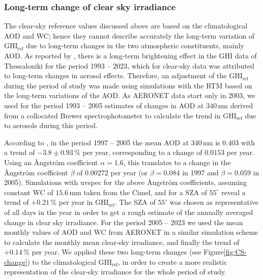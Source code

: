 \documentclass[preprint, 5p,
authoryear]{elsarticle} %
\begin{document}
\hypertarget{long-term-change-of-clear-sky-irradiance}{%
\subsubsection{Long-term change of clear sky
irradiance}\label{long-term-change-of-clear-sky-irradiance}}

The clear-sky reference values discussed above are based on the
climatological AOD and WC; hence they cannot describe accurately the
long-term variation of \(\text{GHI}_\text{ref}\) due to long-term
changes in the two atmospheric constituents, mainly AOD. As reported by
\citet{Natsis2023}, there is a long-term brightening effect in the GHI
data of Thessaloniki for the period 1993 -- 2023, which for clear-sky
data was attributed to long-term changes in aerosol effects. Therefore,
an adjustment of the \(\text{GHI}_\text{ref}\) during the period of
study was made using simulations with the RTM based on the long-term
variations of the AOD. As AERONET data start only in 2003, we used for
the period 1993 -- 2005 estimates of changes in AOD at
\(340\,\text{nm}\) derived from a collocated Brewer spectrophotometer
\citep{Kazadzis2007} to calculate the trend in \(\text{GHI}_\text{ref}\)
due to aerosols during this period.

According to \citet{Kazadzis2007}, in the period 1997 -- 2005 the mean
AOD at \(340\,\text{nm}\) is \(0.403\) with a trend of
\(-3.8\pm0.93\,\%\) per year, corresponding to a change of \(0.0153\)
per year. Using an Ångström coefficient \(\alpha = 1.6\), this
translates to a change in the Ångström coefficient \(\beta\) of
\(0.00272\) per year (or \(\beta=0.084\) in 1997 and \(\beta=0.059\) in
2005). Simulations with uvspec for the above Ångström coefficients,
assuming constant WC of \(15.6\,\text{mm}\) taken from the Cimel, and
for a SZA of \(55^\circ\) reveal a trend of \(+0.21\,\%\) per year in
\(\text{GHI}_\text{ref}\). The SZA of \(55^\circ\) was chosen as
representative of all days in the year in order to get a rough estimate
of the annually averaged change in clear sky irradiance. For the period
2005 -- 2023 we used the mean monthly values of AOD and WC from AERONET
in a similar simulation scheme to calculate the monthly mean clear-sky
irradiance, and finally the trend of \(+0.14\,\%\) per year. We applied
these two long-term changes (see
Figure\nobreakspace{}\ref{fig:CS-change}) to the climatological
\(\text{GHI}_\text{ref}\), in order to create a more realistic
representation of the clear-sky irradiance for the whole period of
study.
\end{document}
